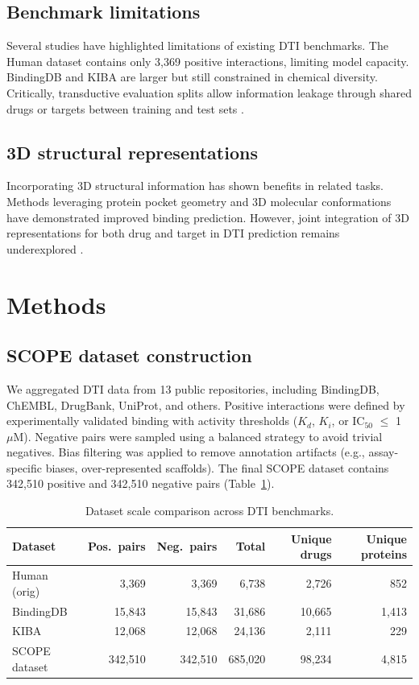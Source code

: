 \documentclass[11pt]{article}
\begin{document}
\subsection{Benchmark limitations}
Several studies have highlighted limitations of existing DTI benchmarks. The Human dataset \citep{liu2015} contains only 3,369 positive interactions, limiting model capacity. BindingDB \citep{gilson2016} and KIBA \citep{tang2014} are larger but still constrained in chemical diversity. Critically, transductive evaluation splits allow information leakage through shared drugs or targets between training and test sets \citep{huang2021,luo2017}.

\subsection{3D structural representations}
Incorporating 3D structural information has shown benefits in related tasks. Methods leveraging protein pocket geometry \citep{stepniewska2018} and 3D molecular conformations \citep{zheng2020} have demonstrated improved binding prediction. However, joint integration of 3D representations for both drug and target in DTI prediction remains underexplored \citep{jiang2022}.

\section{Methods}

\subsection{SCOPE dataset construction}
We aggregated DTI data from 13 public repositories, including BindingDB, ChEMBL, DrugBank, UniProt, and others. Positive interactions were defined by experimentally validated binding with activity thresholds ($K_d$, $K_i$, or IC$_{50}$ $\leq$ 1~$\mu$M). Negative pairs were sampled using a balanced strategy to avoid trivial negatives. Bias filtering was applied to remove annotation artifacts (e.g., assay-specific biases, over-represented scaffolds). The final SCOPE dataset contains 342,510 positive and 342,510 negative pairs (Table~\ref{tab:dataset}).

\begin{table}[htbp]
\centering
\caption{Dataset scale comparison across DTI benchmarks.}
\label{tab:dataset}
\begin{tabular}{@{}lrrrrr@{}}
\toprule
Dataset & Pos.\ pairs & Neg.\ pairs & Total & Unique drugs & Unique proteins \\
\midrule
Human (orig)  & 3,369   & 3,369   & 6,738   & 2,726  & 852   \\
BindingDB     & 15,843  & 15,843  & 31,686  & 10,665 & 1,413 \\
KIBA          & 12,068  & 12,068  & 24,136  & 2,111  & 229   \\
SCOPE dataset & 342,510 & 342,510 & 685,020 & 98,234 & 4,815 \\
\bottomrule
\end{tabular}
\end{table}
\end{document}
